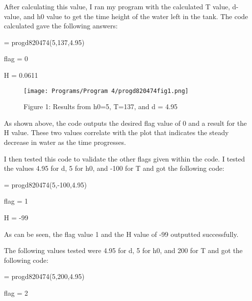 \documentclass{article}
\begin{document}
{After calculating this value, I ran my program with the calculated T value, d-value, and h0 value to get the time height of the water left in the tank.  The code calculated gave the following answers:
\par \medskip \par
[flag, H] = progd820474(5,137,4.95)
\par \medskip \par
flag = 0
\par \medskip \par
H = 0.0611
\par \medskip \par
 \begin{figure}[!ht]
\centering  %
\texttt{[image: Programs/Program 4/progd820474fig1.png]}
 \caption{Figure 1: Results from h0=5, T=137, and d = 4.95}
 \label{f:Graph 1}
\end{figure}
\par \medskip
\par \medskip \par
As shown above, the code outputs the desired flag value of 0 and a result for the H value.  These two values correlate with the plot that indicates the steady decrease in water as the time progresses.
\par \medskip \par
I then tested this code to validate the other flags given within the code.  I tested the values 4.95 for d, 5 for h0, and -100 for T and got the following code:
\par \medskip \par
[flag, H] = progd820474(5,-100,4.95)
\par \medskip \par
flag = 1
\par \medskip \par
H = -99
\par \medskip \par
As can be seen, the flag value 1 and the H value of -99 outputted successfully.
\par \medskip \par
The following values tested were 4.95 for d, 5 for h0, and 200 for T and got the following code:
\par \medskip \par
[flag, H] = progd820474(5,200,4.95)
\par \medskip \par
flag = 2
\par \medskip \par
}
\end{document}

